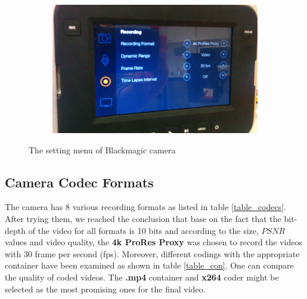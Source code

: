 \documentclass[[12pt,DIV14,BCOR12mm,a4paper,footexclude,headinclude,halfparskip-,twoside,openright,cleardoubleempty,idxtotoc,bibtotoc]{article}
\begin{document}
\begin{figure}[ht]
\begin{subfigure}[b]{0.22\textwidth}
	      \caption{}
		\label{fig_cam_d}
	\end{subfigure}
	\begin{subfigure}[b]{0.22\textwidth}
	      \includegraphics[width=\textwidth]{figures/camera5.png}
	      \caption{}
		\label{fig_cam_e}
	\end{subfigure}
	\caption{The setting menu of Blackmagic camera}
	\label{fig_cam}
\end{figure}


\subsection{ Camera Codec Formats}

The camera has 8 various recording formats as listed in table \ref{table_codecs}. After trying them, we reached the conclusion that base on the fact that the bit-depth of the video for all formats is 10 bits and according to the size, $PSNR$ values and video quality,  the \textbf{4k ProRes Proxy} was chosen to record the videos with 30 frame per second (fps). Moreover, different codings with the appropriate container have been examined as shown in table \ref{table_con}. One can compare the quality of coded videos. The \textbf{.mp4} container and \textbf{x264} coder might be selected as the most promising ones for the final video.
\end{document}
